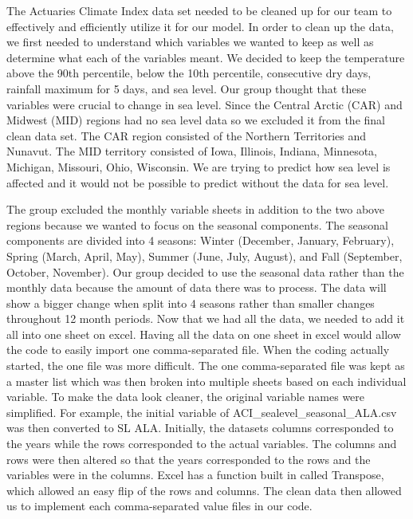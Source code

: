 \documentclass[12pt]{report}
\begin{document}
\indent	\par The Actuaries Climate Index data set needed to be cleaned up for our team to effectively and efficiently utilize it for our model. In order to clean up the data, we first needed to understand which variables we wanted to keep as well as determine what each of the variables meant. We decided to keep the temperature above the 90th percentile, below the 10th percentile, consecutive dry days, rainfall maximum for 5 days, and sea level. Our group thought that these variables were crucial to change in sea level. Since the Central Arctic (CAR) and Midwest (MID) regions had no sea level data so we excluded it from the final clean data set. The CAR region consisted of the Northern Territories and Nunavut. The MID territory consisted of Iowa, Illinois, Indiana, Minnesota, Michigan, Missouri, Ohio, Wisconsin. We are trying to predict how sea level is affected and it would not be possible to predict without the data for sea level. 
		\par The group excluded the monthly variable sheets in addition to the two above regions because we wanted to focus on the seasonal components. The seasonal components are divided into 4 seasons: Winter (December, January, February), Spring (March, April, May), Summer (June, July, August), and Fall (September, October, November). Our group decided to use the seasonal data rather than the monthly data because the amount of data there was to process. The data will show a bigger change when split into 4 seasons rather than smaller changes throughout 12 month periods. Now that we had all the data, we needed to add it all into one sheet on excel. Having all the data on one sheet in excel would allow the code to easily import one comma-separated file. When the coding actually started, the one file was more difficult. The one comma-separated file was kept as a master list which was then broken into multiple sheets based on each individual variable. To make the data look cleaner, the original variable names were simplified. For example, the initial variable of ACI\_sealevel\_seasonal\_ALA.csv  was then converted to SL ALA. Initially, the datasets columns corresponded to the years while the rows corresponded to the actual variables. The columns and rows were then altered so that the years corresponded to the rows and the variables were in the columns. Excel has a function built in called Transpose, which allowed an easy flip of the rows and columns. The clean data then allowed us to implement each comma-separated value files in our code.
\end{document}
